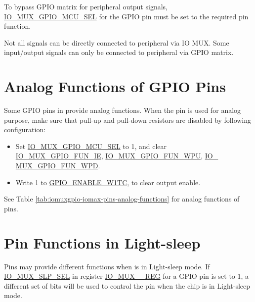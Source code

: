 \documentclass[main\_\_EN.tex]{subfiles}
\begin{document}
To bypass GPIO matrix for peripheral output signals, \hyperref[fielddesc:IOMUXGPIONMCUSEL]{IO\_MUX\_GPIO\_MCU\_SEL} for the GPIO pin must be set to the required pin function.

\begin{tiplisting}
Not all signals can be directly connected to peripheral via IO MUX. Some input/output signals can only be connected to peripheral via GPIO matrix.
\end{tiplisting}

\section{Analog Functions of GPIO Pins}

Some GPIO pins in \chipname{} provide analog functions. When the pin is used for analog purpose, make sure that pull-up and pull-down resistors are disabled by following configuration:

\begin{itemize}
    \item Set \hyperref[fielddesc:IOMUXGPIONMCUSEL]{IO\_MUX\_GPIO\_MCU\_SEL} to 1, and clear \hyperref[fielddesc:IOMUXGPIONFUNIE]{IO\_MUX\_GPIO\_FUN\_IE}, \hyperref[fielddesc:IOMUXGPIONFUNIE]{IO\_MUX\_GPIO\_FUN\_WPU}, \hyperref[fielddesc:IOMUXGPIONFUNIE]{IO\_\\MUX\_GPIO\_FUN\_WPD}.
    \item Write 1 to \hyperref[fielddesc:GPIOENABLEW1TC]{GPIO\_ENABLE\_W1TC\regindex{[n]}}, to clear output enable.
\end{itemize}
See Table \ref{tab:iomuxgpio-iomax-pins-analog-functions} for analog functions of \chipname{} pins.

\section{Pin Functions in Light-sleep}

Pins may provide different functions when \chipname{} is in Light-sleep mode. If \hyperref[fielddesc:IOMUXGPIONSLPSEL]{IO\_MUX\_SLP\_SEL} in register \hyperref[regdesc:IOMUXGPIONREG]{IO\_MUX\_\_REG} for a GPIO pin is set to 1, a different set of bits will be used to control the pin when the chip is in Light-sleep mode.
\end{document}
